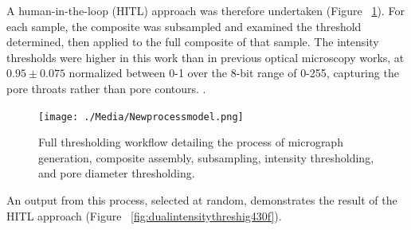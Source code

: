 \documentclass[review]{elsarticle}
\begin{document}
	A human-in-the-loop (HITL) approach was therefore undertaken (Figure
	~\ref{fig:Final Workflow}). For each sample, the composite was subsampled and
	examined the threshold determined, then applied to the full composite of that
	sample. The intensity thresholds were higher in this work than in previous
	optical microscopy works, at $0.95 \pm 0.075$ normalized between 0-1 over the
	8-bit range of 0-255, capturing the pore throats rather than pore contours.
	\citep{Kane2011a,Huang2019}.


\begin{figure}[!htbp]
    \centering
    \texttt{[image: ./Media/Newprocessmodel.png]}
    \caption{Full thresholding workflow detailing the process of micrograph generation,
     composite assembly, subsampling, intensity thresholding, and pore diameter thresholding.}
    \label{fig:Final Workflow}
\end{figure}

An output from this process, selected at random, demonstrates the result of the
HITL approach (Figure ~\ref{fig:dualintensitythreshig430f}).
\end{document}
